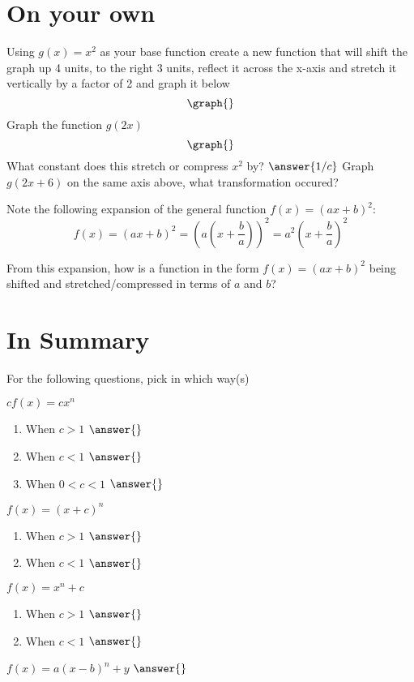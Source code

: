 \documentclass{ximera}
\begin{document}
\section{On your own}
\begin{question}
Using $g(x) = x^2$ as your base function create a new function that will shift the graph up 4 units, to the right 3 units, reflect it across the x-axis and stretch it vertically by a factor of 2 and graph it below
\[
\graph{}
\]
Graph the function $g(2x)$
\[
\graph{}
\]
What constant does this stretch or compress $x^2$ by?
$\answer{1/c}$
Graph $g(2x+6)$ on the same axis above, what transformation occured? 
\begin{freeResponse}
\end{freeResponse}
Note the following expansion of the general function $f(x)=(ax+b)^2$: $$\displaystyle f(x)=\left(ax+b\right)^2=\left(a\left(x+\frac{b}{a}\right)\right)^2=a^2\left(x+\frac{b}{a}\right)^2$$

From this expansion, how is a function in the form $f(x)=(ax+b)^2$ being shifted and stretched/compressed in terms of $a$ and $b$?

\end{question}
\section{In Summary}
For the following questions, pick in which way(s) 
\begin{question}
$cf(x)=cx^n$
\begin{enumerate}
\item When $c>1$ $\answer{}$
\item When $c<1$ $\answer{}$
\item When $0<c<1$ $\answer{}$
\end{enumerate}
$f(x)=(x+c)^n$
\begin{enumerate}
\item When $c>1$ $\answer{}$
\item When $c<1$ $\answer{}$
\end{enumerate}
$f(x)=x^n+c$
\begin{enumerate}
\item When $c>1$ $\answer{}$
\item When $c<1$ $\answer{}$
\end{enumerate}
$f(x)=a(x-b)^n+y$ $\answer{}$
\end{question}
\end{document}
